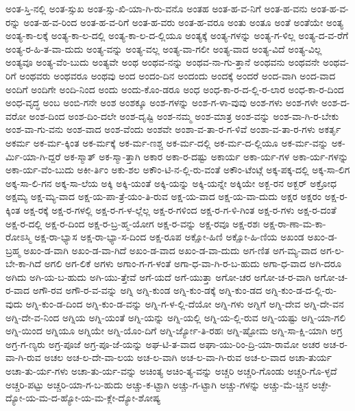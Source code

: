 {ಅಂತ-ಸ್ತಿ-ನಲ್ಲಿ
ಅಂತ-ಸ್ಸುಖ
ಅಂತ-ಸ್ಸು-ಖಿ-ಯಾ-ಗಿ-ರು-ವನೊ
ಅಂತಹ
ಅಂತ-ಹ-ವ-ನಿಗೆ
ಅಂತ-ಹ-ವನು
ಅಂತ-ಹ-ವ-ರನ್ನು
ಅಂತ-ಹ-ವ-ರಿಂದ
ಅಂತ-ಹ-ವ-ರಿಗೆ
ಅಂತ-ಹ-ವರು
ಅಂತ-ಹ-ವರೂ
ಅಂತು
ಅಂತೂ
ಅಂತೆ
ಅಂತೆಯೇ
ಅಂತ್ಯ
ಅಂತ್ಯ-ಕಾ-ಲಕ್ಕೆ
ಅಂತ್ಯ-ಕಾ-ಲ-ದಲ್ಲಿ
ಅಂತ್ಯ-ಕಾ-ಲ-ದ-ಲ್ಲಿಯೂ
ಅಂತ್ಯಕ್ಕೆ
ಅಂತ್ಯ-ಗಳನ್ನು
ಅಂತ್ಯ-ಗ-ಳಿಲ್ಲ
ಅಂತ್ಯ-ದ-ವ-ರೆಗೆ
ಅಂತ್ಯ-ರ-ಹಿ-ತ-ವಾ-ದುದು
ಅಂತ್ಯ-ವನ್ನು
ಅಂತ್ಯ-ವಲ್ಲ
ಅಂತ್ಯ-ವಾ-ಗಲೀ
ಅಂತ್ಯ-ವಾದ
ಅಂತ್ಯ-ವಿದೆ
ಅಂತ್ಯ-ವಿಲ್ಲ
ಅಂತ್ಯವೂ
ಅಂತ್ಯ-ವೆಂ-ಬುದು
ಅಂತ್ಯವೇ
ಅಂಥ
ಅಂಥವ-ನನ್ನು
ಅಂಥವ-ನಾ-ಗು-ತ್ತಾನೆ
ಅಂಥವನು
ಅಂಥವನೇ
ಅಂಥವ-ರಿಗೆ
ಅಂಥವರು
ಅಂಥವರೂ
ಅಂಥವು
ಅಂದ
ಅಂದಂ-ದಿನ
ಅಂದಂದು
ಅಂದಕ್ಕೆ
ಅಂದರೆ
ಅಂದ-ವಾಗಿ
ಅಂದ-ವಾದ
ಅಂದಿಗೆ
ಅಂದಿಗೇ
ಅಂದಿ-ನಿಂದ
ಅಂದು
ಅಂದು-ಕೊಂ-ಡರೂ
ಅಂಧ
ಅಂಧ-ಕಾ-ರ-ದ-ಲ್ಲಿ-ರ-ಲಾರ
ಅಂಧ-ಕಾ-ರ-ದಿಂದ
ಅಂಧ-ವೃದ್ಧ
ಅಂಬ
ಅಂಬಿ-ಗನೇ
ಅಂಶ
ಅಂಶಕ್ಕೂ
ಅಂಶ-ಗಳನ್ನು
ಅಂಶ-ಗ-ಳಾ-ವುವು
ಅಂಶ-ಗಳು
ಅಂಶ-ಗಳೇ
ಅಂಶ-ದ-ವರೋ
ಅಂಶ-ದಿಂದ
ಅಂಶ-ದಿಂ-ದಲೇ
ಅಂಶ-ದೃಷ್ಟಿ
ಅಂಶ-ನಮ್ಮ
ಅಂಶ-ಮಾತ್ರ
ಅಂಶ-ವನ್ನು
ಅಂಶ-ವಾ-ಗಿ-ರ-ಬೇಕು
ಅಂಶ-ವಾ-ಗು-ವನು
ಅಂಶ-ವಾದ
ಅಂಶ-ವೆಂದು
ಅಂಶವೇ
ಅಂಶಾ-ವ-ತಾ-ರ-ಗ-ಳಿವೆ
ಅಂಶಾ-ವ-ತಾ-ರ-ಗಳು
ಅಕರ್ತೃ
ಅಕರ್ಮ
ಅಕ-ರ್ಮ-ಕ್ಕಿಂತ
ಅಕ-ರ್ಮಕ್ಕೆ
ಅಕ-ರ್ಮ-ಣಶ್ಚ
ಅಕ-ರ್ಮ-ದಲ್ಲಿ
ಅಕ-ರ್ಮ-ದ-ಲ್ಲಿಯೂ
ಅಕ-ರ್ಮ-ವನ್ನು
ಅಕ-ರ್ಮಿ-ಯಾ-ಗಿ-ದ್ದರೆ
ಅಕ-ಸ್ಮಾತ್
ಅಕ-ಸ್ಮಾ-ತ್ತಾಗಿ
ಅಕಾರ
ಅಕಾ-ರ-ದಷ್ಟು
ಅಕಾರ್ಯ
ಅಕಾ-ರ್ಯ-ಗಳ
ಅಕಾ-ರ್ಯ-ಗಳನ್ನು
ಅಕಾ-ರ್ಯ-ವೆಂ-ಬುದು
ಅಕೀ-ರ್ತಿಂ
ಅಕು-ಶಲ
ಅಕೌಂ-ಟಿ-ನ-ಲ್ಲಿ-ರು-ವಂತೆ
ಅಕೌಂ-ಟೆಂಟ್ಗೆ
ಅಕ್ಕ-ಪಕ್ಕ-ದಲ್ಲಿ
ಅಕ್ಕ-ಸಾ-ಲಿಗ
ಅಕ್ಕ-ಸಾ-ಲಿ-ಗನ
ಅಕ್ಕ-ಸಾ-ಲೆಯ
ಅಕ್ಕಿ
ಅಕ್ಕಿ-ಯಂತೆ
ಅಕ್ಕಿ-ಯನ್ನು
ಅಕ್ಕಿ-ಯನ್ನೇ
ಅಕ್ಕಿಯೇ
ಅಕ್ಬ-ರನ
ಅಕ್ಬರ್
ಅಕ್ರೋಧ
ಅಕ್ಷಮ್ಯ
ಅಕ್ಷ-ಮ್ಯ-ವಾದ
ಅಕ್ಷ-ಯ-ಪಾ-ತ್ರೆ-ಯಂ-ತಿ-ರುವ
ಅಕ್ಷ-ಯ-ವಾದ
ಅಕ್ಷ-ಯ-ವಾ-ದುದು
ಅಕ್ಷರ
ಅಕ್ಷರಂ
ಅಕ್ಷ-ರ-ಕ್ಕಿಂತ
ಅಕ್ಷ-ರಕ್ಕೆ
ಅಕ್ಷ-ರ-ಗಳಲ್ಲಿ
ಅಕ್ಷ-ರ-ಗ-ಳ-ಲ್ಲೆಲ್ಲ
ಅಕ್ಷ-ರ-ಗಳಿಂದ
ಅಕ್ಷ-ರ-ಗ-ಳಿ-ಗಿಂತ
ಅಕ್ಷ-ರ-ಗಳು
ಅಕ್ಷ-ರ-ದಂತೆ
ಅಕ್ಷ-ರ-ದಲ್ಲಿ
ಅಕ್ಷ-ರ-ದಿಂದ
ಅಕ್ಷ-ರ-ಬ್ರ-ಹ್ಮ-ಯೋಗ
ಅಕ್ಷ-ರ-ವನ್ನು
ಅಕ್ಷ-ರವೂ
ಅಕ್ಷ-ರಶಃ
ಅಕ್ಷ-ರಾ-ಣಾ-ಮ-ಕಾ-ರೋಽಸ್ಮಿ
ಅಕ್ಷ-ರಾ-ಭ್ಯಾಸ
ಅಕ್ಷ-ರಾ-ಭ್ಯಾ-ಸ-ದಿಂದ
ಅಕ್ಷ-ರೂಪ
ಅಕ್ಷೋ-ಹಿಣಿ
ಅಕ್ಷೋ-ಹಿ-ಣಿಯ
ಅಖಂಡ
ಅಖಂ-ಡ-ಬ್ರಹ್ಮ
ಅಖಂ-ಡ-ವಾಗಿ
ಅಖಂ-ಡ-ವಾ-ಗಿದೆ
ಅಖಂ-ಡ-ವಾದ
ಅಖಂ-ಡ-ವಾ-ದುದು
ಅಗ-ಣಿತ
ಅಗ-ಮ್ಯ-ವಾದ
ಅಗ-ಲ-ಬೇ-ಕಾ-ಗಿದೆ
ಅಗಲಿ
ಅಗ-ಲಿಕೆ
ಅಗಳು
ಅಗಾಂ-ಗ-ಗ-ಳಂತೆ
ಅಗಾ-ಧ-ವಾ-ಗಿ-ರ-ಬ-ಹುದು
ಅಗಾ-ಧ-ವಾದ
ಅಗಿ-ದರೂ
ಅಗಿದು
ಅಗಿ-ಯ-ಬ-ಹುದು
ಅಗಿ-ಯು-ತ್ತೇವೆ
ಅಗೆ-ಯದೆ
ಅಗೆ-ಯುತ್ತಾ
ಅಗೋ-ಚರ
ಅಗೋ-ಚ-ರ-ವಾಗಿ
ಅಗೋ-ಚ-ರ-ವಾದ
ಅಗೌ-ರವ
ಅಗೌ-ರ-ವ-ವನ್ನು
ಅಗ್ನಿ
ಅಗ್ನಿ-ಕುಂಡ
ಅಗ್ನಿ-ಕುಂ-ಡಕ್ಕೆ
ಅಗ್ನಿ-ಕುಂ-ಡದ
ಅಗ್ನಿ-ಕುಂ-ಡ-ದ-ಲ್ಲಿ-ರು-ವುದು
ಅಗ್ನಿ-ಕುಂ-ಡ-ದಿಂದ
ಅಗ್ನಿ-ಕುಂ-ಡ-ವನ್ನು
ಅಗ್ನಿ-ಗ-ಳ-ಲ್ಲಿ-ದೆಯೋ
ಅಗ್ನಿ-ಗಳು
ಅಗ್ನಿಗೆ
ಅಗ್ನಿ-ದೇವ
ಅಗ್ನಿ-ದೇ-ವನ
ಅಗ್ನಿ-ದೇ-ವ-ನಿಂದ
ಅಗ್ನಿಯ
ಅಗ್ನಿ-ಯಂತೆ
ಅಗ್ನಿ-ಯನ್ನು
ಅಗ್ನಿ-ಯಲ್ಲಿ
ಅಗ್ನಿ-ಯ-ಲ್ಲಿ-ರುವ
ಅಗ್ನಿ-ಯಷ್ಟು
ಅಗ್ನಿ-ಯಾ-ಗಲಿ
ಅಗ್ನಿ-ಯಿಂದ
ಅಗ್ನಿಯೂ
ಅಗ್ನಿಯೇ
ಅಗ್ನಿ-ಯೊಂ-ದಿಗೆ
ಅಗ್ನಿ-ರ್ಜ್ಯೋ-ತಿ-ರಹಃ
ಅಗ್ನಿ-ಷ್ಟೋಮ
ಅಗ್ನಿ-ಸಾ-ಕ್ಷಿ-ಯಾಗಿ
ಅಗ್ರ
ಅಗ್ರ-ಗ-ಣ್ಯರು
ಅಗ್ರ-ಪೂಜೆ
ಅಗ್ರ-ಪೂ-ಜೆ-ಯನ್ನು
ಅಘ-ಟಿ-ತ-ವಾದ
ಅಘಾ-ಯು-ರಿಂ-ದ್ರಿ-ಯಾ-ರಾಮೋ
ಅಚರ
ಅಚ-ರ-ವಾ-ಗಿ-ರುವ
ಅಚಲ
ಅಚ-ಲ-ದೇ-ವಾ-ಲಯ
ಅಚ-ಲ-ವಾಗಿ
ಅಚ-ಲ-ವಾ-ಗಿ-ರುವ
ಅಚ-ಲ-ವಾದ
ಅಚಾ-ತುರ್ಯ
ಅಚಾ-ತು-ರ್ಯ-ಗಳು
ಅಚಾ-ತು-ರ್ಯ-ವನ್ನು
ಅಚಿಂತ್ಯ
ಅಚಿಂ-ತ್ಯ-ವನ್ನು
ಅಚ್ಚರಿ
ಅಚ್ಚರಿ-ಗೊಂಡು
ಅಚ್ಚರಿ-ಗೊ-ಳ್ಳದೆ
ಅಚ್ಚರಿ-ಪಟ್ಟು
ಅಚ್ಚರಿ-ಯಾ-ಗ-ಬ-ಹುದು
ಅಚ್ಚು-ಕ-ಟ್ಟಾಗಿ
ಅಚ್ಚು-ಗ-ಟ್ಟಾಗಿ
ಅಚ್ಚು-ಗಳನ್ನು
ಅಚ್ಚು-ಮೆ-ಚ್ಚಿನ
ಅಚ್ಛೇ-ದ್ಯೋ-ಯ-ಮ-ದ-ಹ್ಯೋ-ಯ-ಮ-ಕ್ಲೇ-ದ್ಯೋ-ಶೋಷ್ಯ
}
